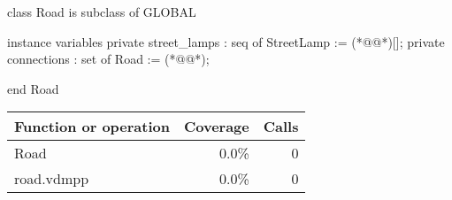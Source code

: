 \documentclass[a4paper]{article}
\begin{document}
\title{}
\author{}
\begin{vdm_al}
class Road is subclass of GLOBAL

instance variables
    private street_lamps : seq of StreetLamp := (*@\vdmnotcovered{}@*)[];
    private connections : set of Road := (*@\vdmnotcovered{}@*){};

end Road
\end{vdm_al}
\bigskip
\begin{longtable}{|l|r|r|}
\hline
Function or operation & Coverage & Calls \\
\hline
\hline
Road & 0.0\% & 0 \\
\hline
\hline
road.vdmpp & 0.0\% & 0 \\
\hline
\end{longtable}
\end{document}
